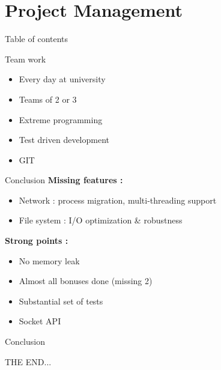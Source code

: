 \documentclass{beamer}
\begin{document}
\section{Project Management}
\begin{frame}{Table of contents}
    \tableofcontents[currentsection]
\end{frame}

\begin{frame}{Team work}
    \begin{itemize}
        \item Every day at university
        \item Teams of 2 or 3
        \item Extreme programming
        \item Test driven development
        \item GIT
    \end{itemize} 
\end{frame}

\begin{frame}{Conclusion}
    \textbf{Missing features :}
    \begin{itemize}
        \item Network : process migration, multi-threading support
        \item File system : I/O optimization \& robustness
    \end{itemize}

    \textbf{Strong points :}
    \begin{itemize}
        \item No memory leak
        \item Almost all bonuses done (missing 2)
        \item Substantial set of tests
        \item Socket API
    \end{itemize}
\end{frame}

\begin{frame}{Conclusion}
    \begin{centering}
        THE END...
    \end{centering}
\end{frame}
\end{document}
